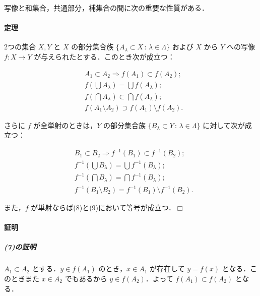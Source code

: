 \documentclass[10pt,b5paper,pandoc]{bxjsarticle}
\let\oldparagraph\paragraph
\renewcommand{\paragraph}[1]{\oldparagraph{#1}\mbox{}}
\let\oldsubparagraph\subparagraph
\renewcommand{\subparagraph}[1]{\oldsubparagraph{#1}\mbox{}}
\begin{document}
写像と和集合，共通部分，補集合の間に次の重要な性質がある．

\hypertarget{ux5b9aux7406}{%
\paragraph{定理}\label{ux5b9aux7406}}

2つの集合 \(X, Y\) と \(X\) の部分集合族
\(\{A_\lambda \subset X \,:\,\lambda \in \Lambda \}\) および \(X\) から
\(Y\) への写像 \(f \colon X \to Y\)
が与えられたとする．このとき次が成立つ：

\begin{align}
&A_1 \subset A_2 \Longrightarrow f(A_1) \subset f(A_2);\\
&f(\bigcup A_\lambda) = \bigcup f(A_\lambda);\\
&f(\bigcap A_\lambda) \subset \bigcap f(A_\lambda);\\
&f(A_1 \setminus A_2) \supset f(A_1) \setminus f(A_2).
\end{align}

さらに \(f\) が全単射のときは，\(Y\) の部分集合族
\(\{B_\lambda \subset Y \,:\,\lambda \in \Lambda \}\)
に対して次が成立つ：

\begin{align}
&B_1 \subset B_2 \Longrightarrow f^{-1}(B_1) \subset f^{-1}(B_2);\\
&f^{-1}(\bigcup B_\lambda) = \bigcup f^{-1}(B_\lambda);\\
&f^{-1}(\bigcap B_\lambda) = \bigcap f^{-1}(B_\lambda);\\
&f^{-1}(B_1 \setminus B_2) = f^{-1}(B_1) \setminus f^{-1}(B_2).
\end{align}

また，\(f\) が単射ならば(8)と(9)において等号が成立つ．\(\Box\)

\hypertarget{ux8a3cux660e-1}{%
\paragraph{証明}\label{ux8a3cux660e-1}}

\hypertarget{ux306eux8a3cux660e-3}{%
\subparagraph{(7)の証明}\label{ux306eux8a3cux660e-3}}

\(A_1 \subset A_2\) とする．\(y \in f(A_1)\) のとき，\(x \in A_1\)
が存在して \(y = f(x)\) となる．このときまた \(x \in A_2\) でもあるから
\(y \in f(A_2)\)．よって \(f(A_1) \subset f(A_2)\) となる．
\end{document}
